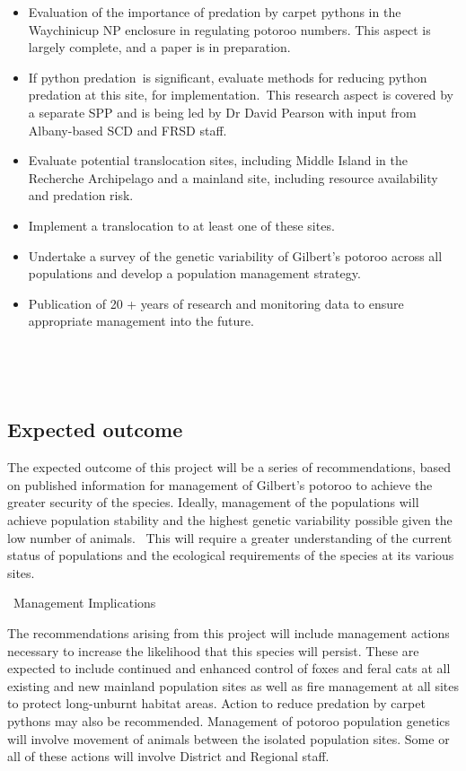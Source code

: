 \documentclass[version=last,
    paper=a4,                               %
    10pt,                                   %
    dvipsnames,
    oneside,                              %
    headings=openany,                       %
    open=any,
    BCOR=7mm,                               %
    DIV=15,     %
]{scrbook}
\providecommand{\tightlist}{\setlength{\itemsep}{0pt}\setlength{\parskip}{0pt}}
\begin{document}
\begin{itemize}
\tightlist
\item
  Evaluation of the importance of predation by carpet pythons in the
  Waychinicup NP enclosure in regulating potoroo numbers. This aspect is
  largely complete, and a paper is in preparation.
\item
  If python predation~is significant, evaluate methods for reducing
  python predation at this site, for implementation.~This research
  aspect is covered by a separate SPP and is being led by Dr David
  Pearson with input from Albany-based SCD and FRSD staff.
\item
  Evaluate potential translocation sites, including Middle Island in the
  Recherche Archipelago and a mainland site, including resource
  availability and predation risk.
\item
  Implement a translocation to at least one of these sites.
\item
  Undertake a survey of the genetic variability of Gilbert's potoroo
  across all populations and develop a population management strategy.
\item
  Publication of 20 + years of research and monitoring data to ensure
  appropriate management into the future.
\end{itemize}

~

~




\subsection*{Expected outcome}

The expected outcome of this project will be a series of
recommendations, based on published information for management of
Gilbert's potoroo to achieve the greater security of the species.
Ideally, management of the populations will achieve population stability
and the highest genetic variability possible given the low number of
animals.~ This will require a greater understanding of the current
status of populations and the ecological requirements of the species at
its various sites.

~Management Implications

The recommendations arising from this project will include management
actions necessary to increase the likelihood that this species will
persist. These are expected to include continued and enhanced control of
foxes and feral cats at all existing and new mainland population sites
as well as fire management at all sites to protect long-unburnt habitat
areas. Action to reduce predation by carpet pythons may also be
recommended. Management of potoroo population genetics will involve
movement of animals between the isolated population sites. Some or all
of these actions will involve District and Regional staff.
\end{document}
